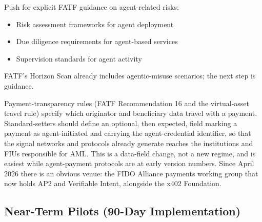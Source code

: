 \documentclass[11pt,letterpaper]{article}
\begin{document}
\begin{recbox}
Push for explicit FATF guidance on agent-related risks:
\begin{itemize}
  \item Risk assessment frameworks for agent deployment
  \item Due diligence requirements for agent-based services
  \item Supervision standards for agent activity
\end{itemize}
FATF's Horizon Scan already includes agentic-misuse scenarios; the next step is guidance.
\end{recbox}

\begin{recbox}
Payment-transparency rules (FATF Recommendation 16 and the virtual-asset travel rule) specify which originator and beneficiary data travel with a payment. Standard-setters should define an optional, then expected, field marking a payment as agent-initiated and carrying the agent-credential identifier, so that the signal networks and protocols already generate reaches the institutions and FIUs responsible for AML. This is a data-field change, not a new regime, and is easiest while agent-payment protocols are at early version numbers. Since April 2026 there is an obvious venue: the FIDO Alliance payments working group that now holds AP2 and Verifiable Intent, alongside the x402 Foundation.
\end{recbox}


\subsection{Near-Term Pilots (90-Day Implementation)}
\end{document}
